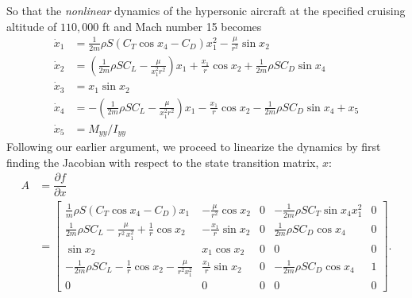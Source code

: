 \begin{example}
So that the \textit{nonlinear} dynamics of the hypersonic aircraft at the specified cruising altitude of $110,000$ ft and Mach number 15 becomes
%
\begin{subequations}
	\begin{align}
		\dot{x}_1 & = \frac{1}{2m}\rho S \left(C_T \cos x_4 - C_D\right) x_1^2 - \frac{\mu}{r^2} \sin x_2 \\
		\dot{x}_2 &=  \left(\frac{1}{2m}\rho S C_L - \frac{\mu}{x_1^2r^2}\right) x_1 + \frac{x_1}{r} \cos x_2 +\frac{1}{2m}\rho S C_D \sin x_4 \\
		\dot{x}_3 &= x_1 \sin x_2 \\
		\dot{x}_4 &= - \left(\frac{1}{2m}\rho S  C_L - \frac{\mu}{x_1^2r^2}\right) x_1 - \frac{x_1}{r} \cos x_2 -\frac{1}{2m}\rho S C_D \sin x_4 + x_5   \\
		\dot{x}_5 &= M_{yy}/I_{yy}
	\end{align}
\end{subequations}
%
Following our earlier argument, we proceed to linearize the dynamics by first finding the Jacobian with respect to the  state transition matrix, $x$:
%
\begin{align}
	A &= \dfrac{\partial f}{\partial x} \nonumber \\%
	  &= \begin{bmatrix}
	  	\frac{1}{m}\rho S \left(C_T \cos x_4 - C_D\right) x_1 & - \frac{\mu}{r^2}\cos x_2 & 0 & -\frac{1}{2m}\rho S C_T \sin x_4 x_1^2 & 0 \\
	  	\frac{1}{2m}\rho S C_L - \frac{\mu}{r^2 \, x_1^2} +  \frac{1}{r} \cos x_2 &  -\frac{x_1}{r} \sin x_2 & 0 & \frac{1}{2m}\rho S C_D \cos x_4 & 0 \\
	  	\sin x_2 & x_1 \cos x_2 & 0 & 0 & 0 \\
	  	- \frac{1}{2m}\rho S C_L - \frac{1}{r} \cos x_2 - \frac{\mu}{r^2 x^2_1} & \frac{x_1}{r} \sin x_2 & 0 & -\frac{1}{2m}\rho S C_D \cos x_4 & 1 \\
	  	0 & 0 & 0 & 0 & 0
	  \end{bmatrix}.
\end{align}


\end{example}
